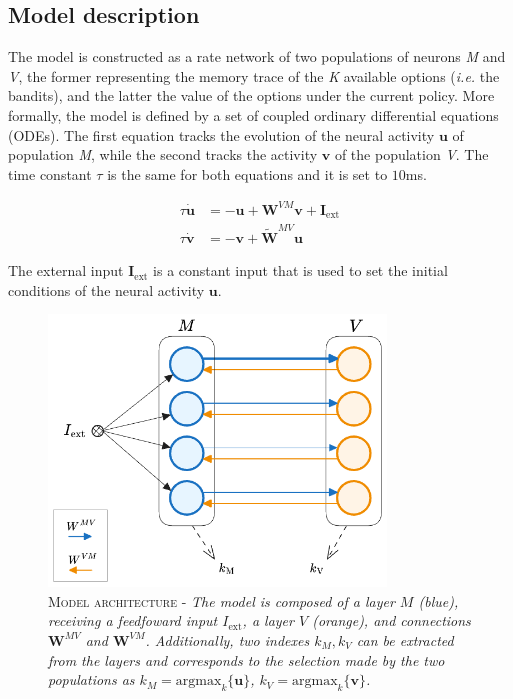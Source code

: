 
\subsection{Model description}
The model is constructed as a rate network of two populations of neurons \textit{M} and \textit{V}, the former representing the memory trace of the \textit{K} available options (\textit{i.e.} the bandits), and the latter the value of the options under the current policy.
More formally, the model is defined by a set of coupled ordinary differential equations (ODEs).
The first equation tracks the evolution of the neural activity $\textbf{u}$ of population \textit{M}, while the second tracks the activity $\textbf{v}$ of the population \textit{V}. The time constant $\tau$ is the same for both equations and it is set to $10$ms.

\begin{equation}
\begin{aligned}
    \tau \dot{\textbf{u}}&= -\textbf{u} + \textbf{W}^{VM}\textbf{v} + \textbf{I}_{\text{ext}} \\
    \tau \dot{\textbf{v}}&= -\textbf{v} + \tilde{\textbf{W}}^{MV}\textbf{u}
\end{aligned}
\end{equation}\label{eq:main}

\noindent The external input $\textbf{I}_{\text{ext}}$ is a constant input that is used to set the initial conditions of the neural activity $\textbf{u}$. 

\begin{figure}[h]
    \centering
    \includegraphics[width=0.8\textwidth]{figures/minb_architecture.png}
    \caption{\textsc{Model architecture} - \textit{The model is composed of a layer $M$ (blue), receiving a feedfoward input $I_{\text{ext}}$, a layer $V$ (orange), and connections $\textbf{W}^{MV}$ and $\textbf{W}^{VM}$. Additionally, two indexes $k_{M}, k_{V}$  can be extracted from the layers and
    corresponds to the selection made by the two populations as $k_{M}=\text{argmax}_{k} \{\textbf{u}\}$, $k_{V}=\text{argmax}_{k} \{\textbf{v}\}$.}}
    \label{fig:main_architecture}
\end{figure}

